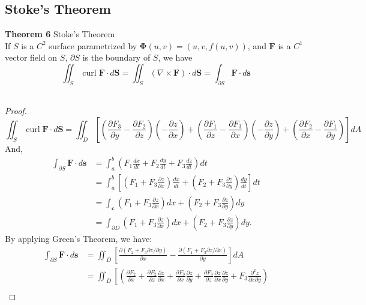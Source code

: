 \documentclass[11pt]{article}
\begin{document}
\newpage

\subsection{Stoke's Theorem}
\textbf{Theorem 6} Stoke's Theorem\\
If $S$ is a $C^2$ surface parametrized by $\mathbf{\Phi}(u,v) = (u,v,f(u,v))$, and $\mathbf{F}$ is a $C^1$ vector field on $S$, $\partial S$ is the boundary of $S$, we have
\[\iint_{S} \operatorname{curl} \mathbf{F} \cdot d \mathbf{S}=\iint_{S}(\nabla \times \mathbf{F}) \cdot d \mathbf{S}=\int_{\partial S} \mathbf{F} \cdot d \mathbf{s}\]
\\
\begin{proof}
    \[
        \iint_{S} \operatorname{curl} \mathbf{F} \cdot d \mathbf{S}= \iint_{D}\left[\left(\frac{\partial F_{3}}{\partial y}-\frac{\partial F_{2}}{\partial z}\right)\left(-\frac{\partial z}{\partial x}\right)+\left(\frac{\partial F_{1}}{\partial z}-\frac{\partial F_{3}}{\partial x}\right)\left(-\frac{\partial z}{\partial y}\right)+\left(\frac{\partial F_{2}}{\partial x}-\frac{\partial F_{1}}{\partial y}\right)\right] d A
    \]
    And,
    \[
    \begin{aligned}
        \int_{\partial S} \mathbf{F} \cdot d \mathbf{s}
        &=\int_{a}^{b}\left(F_{1} \frac{d x}{d t}+F_{2} \frac{d y}{d t}+F_{3} \frac{d z}{d t}\right) d t\\ 
        &=\int_{a}^{b}\left[\left(F_{1}+F_{3} \frac{\partial z}{\partial x}\right) \frac{d x}{d t}+\left(F_{2}+F_{3} \frac{\partial z}{\partial y}\right) \frac{d y}{d t}\right] d t \\
        &=\int_{\mathbf{c}}\left(F_{1}+F_{3} \frac{\partial z}{\partial x}\right) d x+\left(F_{2}+F_{3} \frac{\partial z}{\partial y}\right) d y \\
        &=\int_{\partial D}\left(F_{1}+F_{3} \frac{\partial z}{\partial x}\right) d x+\left(F_{2}+F_{3} \frac{\partial z}{\partial y}\right) d y .
    \end{aligned}
    \]
    By applying Green's Theorem, we have:
    \[
    \begin{aligned}
        \int_{\partial S} \mathbf{F} \cdot d \mathbf{s}&=\iint_{D}\left[\frac{\partial\left(F_{2}+F_{3} \partial z / \partial y\right)}{\partial x}-\frac{\partial\left(F_{1}+F_{3} \partial z / \partial x\right)}{\partial y}\right] d A\\
        &= \iint_{D}{\left[\left(\frac{\partial F_{2}}{\partial x}+\frac{\partial F_{2}}{\partial z} \frac{\partial z}{\partial x}+\frac{\partial F_{3}}{\partial x} \frac{\partial z}{\partial y}+\frac{\partial F_{3}}{\partial z} \frac{\partial z}{\partial x} \frac{\partial z}{\partial y}+F_{3} \frac{\partial^{2} z}{\partial x \partial y}\right)\right.} \\

\end{aligned}\]
\end{proof}
\end{document}
